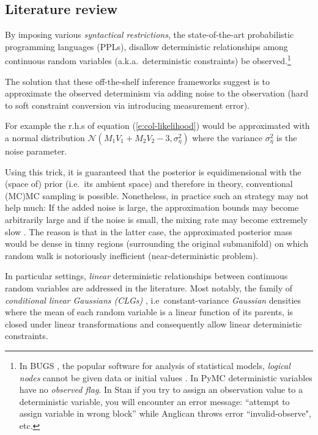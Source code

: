 \subsection{Literature review}
By imposing various %
\emph{syntactical restrictions}, %
the state-of-the-art probabilistic programming languages (PPLs),
disallow deterministic relationships among continuous random variables 
(a.k.a.\ deterministic constraints) be observed.\footnote{
In BUGS \citep{lunn2009bugs}, the popular software for analysis of statistical models, \emph{logical nodes} cannot be given data or initial values .
In PyMC \citep{patil2010pymc} deterministic variables have no \emph{observed flag}. 
In Stan \citep{stan-manual:2014} 
if you try to assign an observation value to a deterministic variable, you will encounter an error message: 
``attempt to assign variable in wrong block'' while 
Anglican \citep{wood2014new} throws error ``invalid-observe", etc.}

The solution that these off-the-shelf inference frameworks suggest is to approximate the observed determinism via adding noise to the observation 
(hard to soft constraint conversion via introducing measurement error).

For example the r.h.s of equation (\ref{e:col-likelihood}) would be 
approximated with a normal distribution
{\footnotesize $\mathcal{N}( M_1 V_1 + M_2 V_2 - 3, \sigma_\eta^2)$}  
where the variance $\sigma_\eta^2$ is the noise parameter.

Using this trick, it is guaranteed that the posterior is equidimensional with the (space of) prior (i.e.\ its ambient space) and therefore in theory, conventional (MC)MC sampling is possible.
Nonetheless, in practice such an strategy may not help much:
If the added noise is large, 
the approximation bounds may become arbitrarily large
and if the noise is small, 
the mixing rate may become extremely slow \citep{chin1987bayesian}. 
The reason is that in the latter case, 
 the approximated posterior mass would be dense in tinny regions (surrounding the original submanifold) on which random walk
is notoriously inefficient (near-deterministic problem).  

In particular settings, \emph{linear} deterministic relationships between continuous random variables
are addressed in the literature.  
Most notably, 
the family of \emph{conditional linear Gaussians (CLGs)} \citep{lauritzen2001stable}, 
i.e\ constant-variance \emph{Gaussian} densities where the mean of each random variable is a linear function of its parents,
is closed under linear transformations and consequently
allow linear deterministic constraints.%


